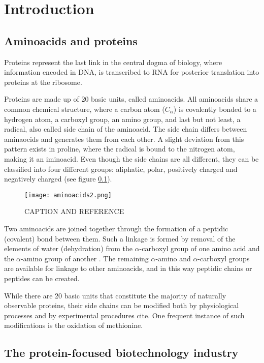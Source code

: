 \chapter*{Introduction}
\label{chap:introduction}

\section{Aminoacids and proteins}

Proteins represent the last link in the central dogma of biology, where information encoded in DNA, is transcribed to RNA for posterior translation into proteins at the ribosome.

Proteins are made up of 20 basic units, called aminoacids. All aminoacids share a common chemical structure, where a carbon atom ($C_\alpha$) is covalently bonded to a hydrogen atom, a carboxyl group, an amino group, and last but not least, a radical, also called side chain of the aminoacid. The side chain differs between aminaocids and generates them from each other. A slight deviation from this pattern exists in proline, where the radical is bound to the nitrogen atom, making it an iminoacid. Even though the side chains are all different, they can be classified into four different groups: aliphatic, polar, positively charged and negatively charged (see figure \ref{fig:aminoacids}).

\begin{figure}
  \centering
  \texttt{[image: aminoacids2.png]}
  \caption[Aminoacids]{CAPTION AND REFERENCE}
  \label{fig:aminoacids}
\end{figure}

Two aminoacids are joined together through the formation of a peptidic (covalent) bond between them. Such a linkage is formed by removal of the elements of water (dehydration) from the $\alpha$-carboxyl group of one amino acid and the $\alpha$-amino group of another \cite{Nelson2008}. The remaining $\alpha$-amino and $\alpha$-carboxyl groups are available for linkage to other aminoacids, and in this way peptidic chains or peptides can be created.

While there are 20 basic units that constitute the majority of naturally observable proteins, their side chains can be modified both by physiological processes and by experimental procedures cite. One frequent instance of such modifications is the oxidation of methionine.


\section{The protein-focused biotechnology industry}


